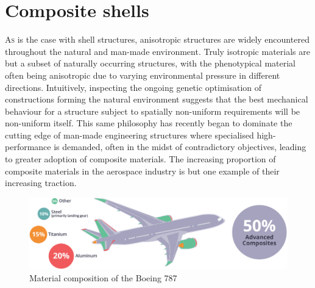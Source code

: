 



\chapter{Composite shells}
\label{chap:chapter_2_1}

\renewcommand{\Thema}{Composite shells}

\lettrine[lines=2]{A}{s} is the case with shell structures, anisotropic structures are widely encountered throughout the natural and man-made environment. Truly isotropic materials are but a subset of naturally occurring structures, with the phenotypical material often being anisotropic due to varying environmental pressure in different directions. Intuitively, inspecting the ongoing genetic optimisation of constructions forming the natural environment suggests that the best mechanical behaviour for a structure subject to spatially non-uniform requirements will be non-uniform itself. This same philosophy has recently began to dominate the cutting edge of man-made engineering structures where specialised high-performance is demanded, often in the midst of contradictory objectives, leading to greater adoption of composite materials. The increasing proportion of composite materials in the aerospace industry is but one example of their increasing traction.

\begin{figure}[H]
	\centering
	\def\svgwidth{\columnwidth}
	\includegraphics[width=14cm]{images/composites_aerospace.png}
	\caption{Material composition of the Boeing 787 \cite{AMCA2017}}
	\label{composite_aerospace}
\end{figure}

